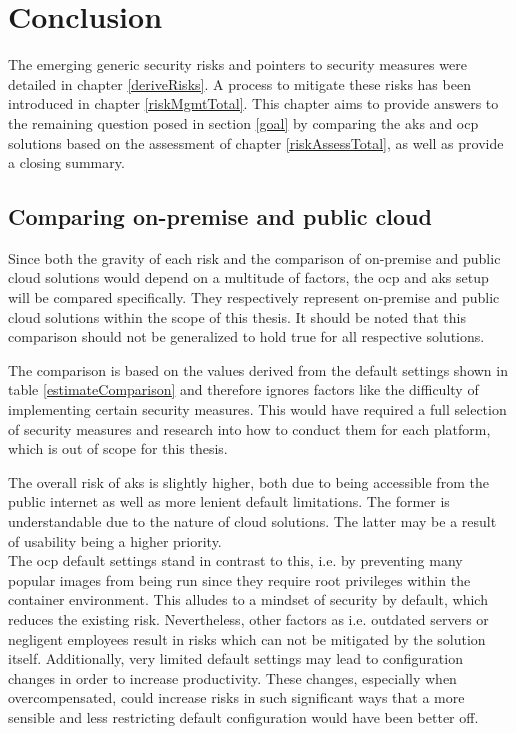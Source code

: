 \chapter{Conclusion}
The emerging generic security risks and pointers to security measures were detailed in chapter \ref{deriveRisks}. A process to mitigate these risks has been introduced in chapter \ref{riskMgmtTotal}. 
This chapter aims to provide answers to the remaining question posed in section \ref{goal} by comparing the \gls{aks} and \gls{ocp} solutions based on the assessment of chapter \ref{riskAssessTotal}, as well as provide a closing summary.

\section{Comparing on-premise and public cloud}

Since both the gravity of each risk and the comparison of on-premise and public cloud solutions would depend on a multitude of factors, the \gls{ocp} and \gls{aks} setup will be compared specifically. They respectively represent on-premise and public cloud solutions within the scope of this thesis. It should be noted that this comparison should not be generalized to hold true for all respective solutions.

The comparison is based on the values derived from the default settings shown in table \ref{estimateComparison} and therefore ignores factors like the difficulty of implementing certain security measures. This would have required a full selection of security measures and research into how to conduct them for each platform, which is out of scope for this thesis.


The overall risk of \gls{aks} is slightly higher, both due to being accessible from the public internet as well as more lenient default limitations. The former is understandable due to the nature of cloud solutions. The latter may be a result of usability being a higher priority. \\
The \gls{ocp} default settings stand in contrast to this, i.e. by preventing many popular images from being run since they require root privileges within the container environment. This alludes to a mindset of security by default, which reduces the existing risk. Nevertheless, other factors as i.e. outdated servers or negligent employees result in risks which can not be mitigated by the solution itself. Additionally, very limited default settings may lead to configuration changes in order to increase productivity. These changes, especially when overcompensated, could increase risks in such significant ways that a more sensible and less restricting default configuration would have been better off.

